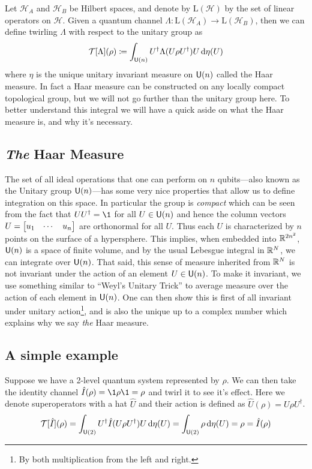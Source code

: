\documentclass[11pt,english]{article}
\theoremstyle{definition}
\begin{document}
Let $\mathcal{H}_A$ and $\mathcal{H}_B$ be Hilbert spaces, and denote by $\mathrm{L}(\mathcal{H})$ by the set of linear operators on $\mathcal{H}$.
Given a quantum channel $\Lambda: \mathrm{L}(\mathcal{H}_A)\to\mathrm{L}(\mathcal{H}_B)$, then we can define twirling $\Lambda$ with respect to the unitary group as
\begin{equation}
  \mathcal{T}[\Lambda](\rho)\coloneqq \int_{\mathsf{U}(n)}U^\dagger\Lambda(U\rho U^\dagger)U\dd{\eta(U)}
\end{equation}
where $\eta$ is the unique unitary invariant measure on $\mathsf{U}(n)$ called the Haar measure.
In fact a Haar measure can be constructed on any locally compact topological group, but we will not go further than the unitary group here.
To better understand this integral we will have a quick aside on what the Haar measure is, and why it's necessary.

\subsection{\emph{The} Haar Measure}
The set of all ideal operations that one can perform on $n$ qubits---also known as the Unitary group $\mathsf{U}(n)$---has some very nice properties that allow us to define integration on this space.
In particular the group is \emph{compact} which can be seen from the fact that $UU^\dagger = \1$ for all $U\in\mathsf{U}(n)$ and hence the column vectors $U = \mqty[u_1 & \cdots & u_n]$ are orthonormal for all $U$.
Thus each $U$ is characterized by $n$ points on the surface of a hypersphere.
This implies, when embedded into $\mathbb{R}^{2n^2}$, $\mathsf{U}(n)$ is a space of finite volume, and by the usual Lebesgue integral in $\mathbb{R}^N$, we can integrate over $\mathsf{U}(n)$.
That said, this sense of measure inherited from $\mathbb{R}^N$ is not invariant under the action of an element $U\in\mathsf{U}(n)$.
To make it invariant, we use something similar to ``Weyl's Unitary Trick'' to average measure over the action of each element in $\mathsf{U}(n)$.
One can then show this is first of all invariant under unitary action\footnote{By both multiplication from the left and right.}, and is also the unique up to a complex number which explains why we say \emph{the} Haar measure.


\subsection{A simple example}
Suppose we have a 2-level quantum system represented by $\rho$.
We can then take the identity channel $\hat{I}(\rho) = \1\rho\1 = \rho$ and twirl it to see it's effect.
Here we denote superoperators with a hat $\hat{U}$ and their action is defined as $\hat{U}(\rho) = U\rho U^\dagger$.
\begin{equation}
  \mathcal{T}[\hat{I}](\rho) = \int_{\mathsf{U}(2)}U^\dagger\hat{I}(U\rho U^\dagger) U\dd{\eta(U)} = \int_{\mathsf{U}(2)}\rho\dd{\eta(U)}                                = \rho = \hat{I}(\rho)
\end{equation}
\end{document}
